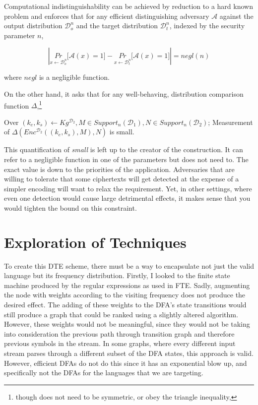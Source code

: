 \documentclass[ %
                    author={Samuel Russell},
                supervisor={Prof. Bogdan Warinschi},
                    degree={MEng},
                     title={Innocuous Ciphertexts},
                  subtitle={The DE-CENSOR Scheme},
                      type={Research},
                      year={2018} ]{dissertation}
\begin{document}
Computational indistinguishability can be achieved by reduction to a hard known problem and enforces that for any efficient distinguishing adversary $\mathcal{A}$ against the output distribution $\mathcal{D}_o^n$ and the target distribution $\mathcal{D}_t^n$, indexed by the security parameter $n$, 

$$ \left|  \underset{x \leftarrow \mathcal{D}_o^n}{Pr} \big[ \mathcal{A}(x) = 1 \big] - \underset{x \leftarrow \mathcal{D}_t^n}{Pr} \big[ \mathcal{A}(x) = 1 \big]\right| = negl(n)$$

where $negl$ is a negligible function.



On the other hand, it asks that for any well-behaving, distribution comparison function $\Delta$,\footnote{though does not need to be symmetric, or obey the triangle inequality,}

Over $ (k_e,k_s) \leftarrow Kg^{\mathcal{D}_2}, M \in Support_n(\mathcal{D}_1), N \in Support_n(\mathcal{D}_2)$; Measurement of $\Delta \left(  Enc^{\mathcal{D}_2}((k_e,k_s), M), N  \right)$ is small.

This quantification of \textit{small} is left up to the creator of the construction.
It can refer to a negligible function in one of the parameters but does not need to.
The exact value is down to the priorities of the application.
Adversaries that are willing to tolerate that some ciphertexts will get detected at the expense of a simpler encoding will want to relax the requirement.
Yet, in other settings, where even one detection would cause large detrimental effects, it makes sense that you would tighten the bound on this constraint.


\section{Exploration of Techniques}\label{exploration_of_techniques}

To create this DTE scheme, there must be a way to encapsulate not just the valid language but its frequency distribution.
Firstly, I looked to the finite state machine produced by the regular expressions as used in FTE. Sadly, augmenting the node with weights according to the visiting frequency does not produce the desired effect.
The adding of these weights to the DFA's state transitions would still produce a graph that could be ranked using a slightly altered algorithm.
However, these weights would not be meaningful, since they would not be taking into consideration the previous path through transition graph and therefore previous symbols in the stream.
In some graphs, where every different input stream parses through a different subset of the DFA states, this approach is valid.
However, efficient DFAs do not do this since it has an exponential blow up, and specifically not the DFAs for the languages that we are targeting.
\end{document}

